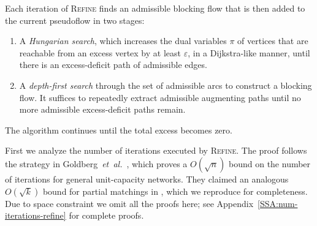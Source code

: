 \documentclass[a4paper,UKenglish]{socg-lipics-v2018}
\makeatletter
\def\etal{\emph{et~al.}}
\def\etal{\textit{et~al.}}
\def\eps{\varepsilon}
\def\fsupply{\phi}
\theoremstyle{plain}
\numberwithin{figure}{section}
\def\EMPH#1{\textcolor{BrickRed}{{\emph{#1}}}}
\def\n@te#1{\textsf{\boldmath \textbf{$\langle\!\langle$#1$\rangle\!\rangle$}}\leavevmode}
\def\note#1{\textcolor{red}{\n@te{#1}}}
\renewcommand{\note}[1]{} %
\makeatother
\begin{document}

Each iteration of \textsc{Refine} finds an admissible blocking flow that is then added to the current pseudoflow in two stages:
\begin{enumerate}
\item
A \EMPH{Hungarian search}, which increases the dual variables $\pi$ of vertices that are reachable from an excess vertex by at least $\eps$, in a Dijkstra-like manner, until there is an excess-deficit path of admissible edges.
\item
A \EMPH{depth-first search} through the set of admissible arcs to construct a blocking flow.
It suffices to repeatedly extract admissible augmenting paths until no more admissible excess-deficit paths remain.
\end{enumerate}
The algorithm continues until the total excess becomes zero.

First we analyze the number of iterations executed by \textsc{Refine}.
The proof follows the strategy in Goldberg~\etal~\cite[Section~3.2]{GHKT17},
which proves a $O(\sqrt{n})$ bound on the number of iterations for general
unit-capacity networks.
They claimed an analogous $O(\sqrt{k})$ bound for partial matchings in
\cite[Section~6.1]{GHKT17}, which we reproduce for completeness.
Due to space constraint we omit all the proofs here;
see Appendix~\ref{SSA:num-iterations-refine} for complete proofs.
\end{document}
